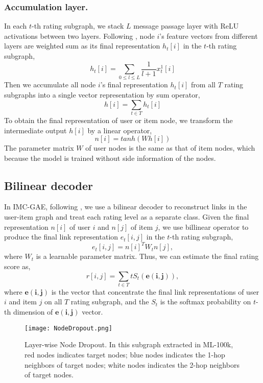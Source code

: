 \documentclass[sigconf]{acmart}
\begin{document}
\subsubsection{Accumulation layer.} 
In each $t$-th rating subgraph, we stack $L$ message passage layer with ReLU activations \cite{agarap2018deep} between two layers. Following \cite{he2020lightgcn}, node $i$'s feature vectors from different layers are weighted sum as its final representation $h_t[i]$ in the $t$-th rating subgraph,
\begin{equation}
    h_t[i] = \sum_{0 \leq l \leq L}\frac{1}{l+1}x_t^1[i] 
\end{equation}
Then we accumulate all node $i$'s final representation $h_t[i]$ from all $T$ rating subgraphs into a single vector representation by sum operator,
\begin{equation}
    h[i] = \sum_{t\in T} h_t[i]
\end{equation}
To obtain the final representation of user or item node, we transform the intermediate output $h[i]$ by a linear operator,
\begin{equation}
    n[i] = tanh(Wh[i])
\end{equation}
The parameter matrix $W$ of user nodes is the same as that of item nodes, which because the model is trained without side information of the nodes.
\subsection{Bilinear decoder}
In IMC-GAE, following \cite{berg2017graph}, we use a bilinear decoder to reconstruct links in the user-item graph and treat each rating level as a separate class. Given the final representation $n[i]$ of user $i$ and $n[j]$ of item $j$, we use billinear operator to produce the final link representation $e_t[i, j]$ in the $t$-th rating subgraph,
\begin{equation}
    e_t[i, j] = n[i]^TW_tn[j],
\end{equation}
where $W_t$ is a learnable parameter matrix. Thus, we can estimate the final rating score as,
\begin{equation}
    r[i, j] = \sum_{t \in T} t S_t(\mathbf{e(i, j)}),
\end{equation}
where $\mathbf{e(i, j)}$ is the vector that concentrate the final link representations of user $i$ and item $j$ on all $T$ rating subgraph, and the $S_t$ is the softmax probability on $t$-th dimension of $\mathbf{e(i, j)}$ vector. 
\begin{figure}[tp]
    \centering\texttt{[image: NodeDropout.png]}
    \caption{Layer-wise Node Dropout. In this subgraph extracted in ML-100k, red nodes indicates target nodes; blue nodes indicates the 1-hop neighbors of target nodes; white nodes indicates the 2-hop neighbors of target nodes.}
    \label{fig:NodeDropout}
\end{figure}
\end{document}
